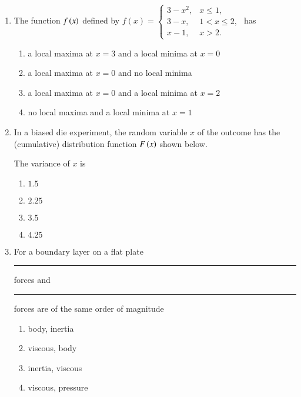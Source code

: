\documentclass[journal]{IEEEtran}
\begin{document}
\begin{enumerate}
\item The function $f\left(x\right)$ defined by $f(x)=
\begin{cases} 
3-x^{2},&x\leq1,\\ 
3-x,&1<x\leq 2,\\ 
x-1,&x>2. 
\end{cases}
$ has
\begin{enumerate}
\item a local maxima at $x=3$ and a local minima at $x=0$
\item a local maxima at $x=0$ and no local minima
\item a local maxima at $x=0$ and a local minima at $x=2$
\item no local maxima and a local minima at $x=1$
\end{enumerate}


\item In a biased die experiment, the random variable $x$ of the outcome has the (cumulative) distribution function $F\left(x\right)$ shown below.\\

The variance of $x$ is
\begin{multicols}{2}
\begin{enumerate}
\item $1.5$
\item $2.25$
\item $3.5$
\item $4.25$
\end{enumerate}
\end{multicols}


\item For a boundary layer on a flat plate \rule{1cm}{0.15mm} forces and \rule{1cm}{0.15mm} forces are of the same order of magnitude
\begin{multicols}{2}
\begin{enumerate}
\item body, inertia
\item viscous, body
\item inertia, viscous
\item viscous, pressure
\end{enumerate}
\end{multicols}



\end{enumerate}
\end{document}
